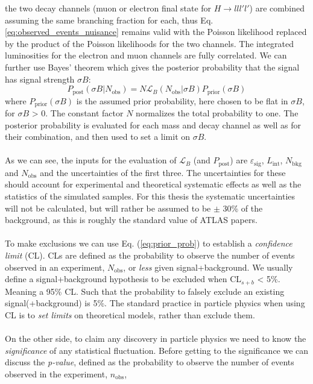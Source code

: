 \documentclass[12pt, a4paper]{book}
\begin{document}
the two decay channels (muon or electron final state for $H\rightarrow lll'l'$) are combined assuming the same branching fraction for each, thus Eq. \ref{eq:observed_events_nuisance} remains valid with the Poisson likelihood replaced by the product of the Poisson likelihoods for the two channels. 
The integrated luminosities for the electron and muon channels are fully correlated. We can further use Bayes' theorem which gives the posterior probability that the signal has signal strength $\sigma B$:
\begin{equation}\label{eq:prior_prob}
    P_{\text{post}}(\sigma B\vert N_{\text{obs}}) = N \mathcal{L}_B (N_{\text{obs}}\vert\sigma B) P_{\text{prior}}(\sigma B)
\end{equation}
where $P_{\text{prior}}(\sigma B)$ is the assumed prior probability, here chosen to be flat in $\sigma B$, for $\sigma B$ > 0. The constant factor $N$ normalizes the total probability to one. The posterior probability is evaluated for each mass and decay channel as well as for their 
combination, and then used to set a limit on $\sigma B$.\\
\\As we can see, the inputs for the evaluation of $\mathcal{L}_B$ (and $P_{\text{post}}$) are $\varepsilon_{\text{sig}}$, $L_{\text{int}}$, $N_{\text{bkg}}$ and $N_{\text{obs}}$ and the uncertainties of the first three. The uncertainties for these should account for experimental 
and theoretical systematic effects as well as the statistics of the simulated samples. For this thesis the systematic uncertainties will not be calculated, but will rather be assumed to be $\pm$ 30\% of the background, as this is roughly the standard value of ATLAS papers.\\
\\To make exclusions we can use Eq. (\ref{eq:prior_prob}) to establish a \textit{confidence limit} (CL). CLs are defined as the probability to observe the number of events observed in an experiment, $N_{\text{obs}}$, or \textit{less} given signal+background. We usually define a signal+background 
hypothesis to be excluded when CL$_{s+b}$ < 5\%. Meaning a 95\% CL. Such that the probability to falsely exclude an existing signal(+background) is 5\%. The standard practice in particle physics when using CL is to \textit{set limits} on theoretical models, rather than exclude them.\\
\\On the other side, to claim any discovery in particle physics we need to know the \textit{significance} of any statistical fluctuation. Before getting to the significance we can discuss the \textit{p-value}, defined as the probability to observe the number of events observed in the experiment, $n_{\text{obs}}$, 
\end{document}
